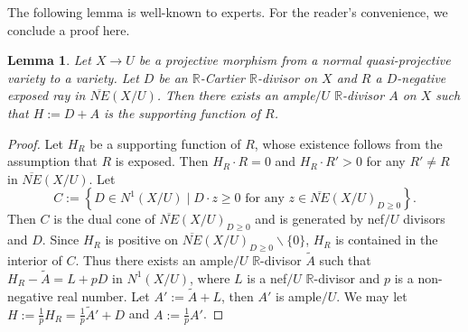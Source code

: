 \documentclass[11pt]{amsart}
\numberwithin{equation}{section}
\newcommand{\Rr}{\mathbb{R}}
\newtheorem{lem}[thm]{Lemma}
\theoremstyle{definition}
\theoremstyle{definition}
\theoremstyle{definition}
\begin{document}
The following lemma is well-known to experts. For the reader's convenience, we conclude a proof here.

\begin{lem}\label{lem: supporting function are +A}
    Let $X\rightarrow U$ be a projective morphism from a normal quasi-projective variety to a variety. Let $D$ be an $\Rr$-Cartier $\Rr$-divisor on $X$ and $R$ a $D$-negative exposed ray in $\overline{NE}(X/U)$. Then there exists an ample$/U$ $\Rr$-divisor $A$ on $X$ such that $H:=D+A$ is the supporting function of $R$.
\end{lem}
\begin{proof}
   Let $H_R$ be a supporting function of $R$, whose existence follows from the assumption that $R$ is exposed. Then $H_R\cdot R=0$ and $H_R\cdot R'>0$ for any $R'\not=R$ in $\overline{NE}(X/U)$. Let 
   $$C:=\left\{D\in N^1(X/U)\mid D\cdot z\geq 0 \text{ for any }z\in\overline{NE}(X/U)_{D\geq0}\right\}.$$
   Then $C$ is the dual cone of $\overline{NE}(X/U)_{D\geq 0}$ and is generated by nef$/U$ divisors and $D$. Since $H_R$ is positive on $\overline{NE}(X/U)_{D\geq 0}\backslash\{0\}$, $H_R$ is contained in the interior of $C$. Thus there exists an ample$/U$ $\Rr$-divisor $\tilde A$ such that $H_R-\tilde A=L+pD$ in $N^1(X/U)$, where $L$ is a nef$/U$ $\Rr$-divisor and $p$ is a non-negative real number. Let $A':=\tilde A+L$, then $A'$ is ample$/U$. We may let $H:=\frac{1}{p}H_R=\frac{1}{p}\tilde A'+D$ and $A:=\frac{1}{p} A'$.
\end{proof}
\end{document}
